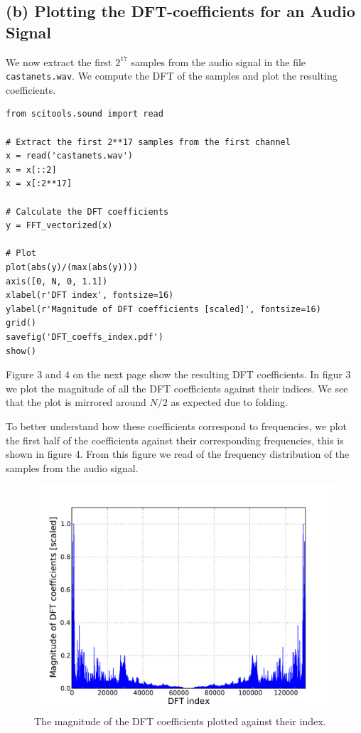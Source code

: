 \documentclass[a4paper, 11pt, notitlepage, english]{article}
\begin{document}
\subsection*{(b) Plotting the DFT-coefficients for an Audio Signal}

We now extract the first $2^{17}$ samples from the audio signal in the file \verb+castanets.wav+. We compute the DFT of the samples and plot the resulting coefficients. 

\begin{lstlisting}
from scitools.sound import read

# Extract the first 2**17 samples from the first channel
x = read('castanets.wav')
x = x[::2]
x = x[:2**17]

# Calculate the DFT coefficients
y = FFT_vectorized(x)

# Plot
plot(abs(y)/(max(abs(y))))
axis([0, N, 0, 1.1])
xlabel(r'DFT index', fontsize=16)
ylabel(r'Magnitude of DFT coefficients [scaled]', fontsize=16)
grid()
savefig('DFT_coeffs_index.pdf')
show()
\end{lstlisting}

Figure 3 and 4 on the next page show the resulting DFT coefficients. In figur 3 we plot the magnitude of all the DFT coefficients against their indices. We see that the plot is mirrored around $N/2$ as expected due to folding.

To better understand how these coefficients correspond to frequencies, we plot the first half of the coefficients against their corresponding frequencies, this is shown in figure 4. From this figure we read of the frequency distribution of the samples from the audio signal.



\begin{figure}[p]
\centering
\includegraphics[width=\textwidth]{DFT_coeffs_index}
\caption{The magnitude of the DFT coefficients plotted against their index.}
\end{figure}
\end{document}
